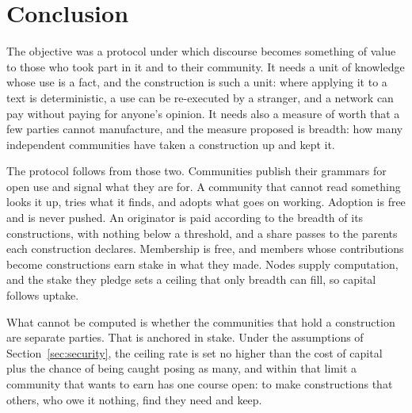 \section{Conclusion}\label{sec:conclusion}

The objective was a protocol under which discourse becomes something of value to those who took part in it and to
their community. It needs a unit of knowledge whose use is a fact, and the construction is such a unit: where
applying it to a text is deterministic, a use can be re-executed by a stranger, and a network can pay without
paying for anyone's opinion. It needs also a measure of worth that a few parties cannot manufacture, and the
measure proposed is breadth: how many independent communities have taken a construction up and kept it.

The protocol follows from those two. Communities publish their grammars for open use and signal what they are for.
A community that cannot read something looks it up, tries what it finds, and adopts what goes on working.
Adoption is free and is never pushed. An originator is paid according to the breadth of its constructions, with
nothing below a threshold, and a share passes to the parents each construction declares. Membership is free, and
members whose contributions become constructions earn stake in what they made. Nodes supply computation, and the
stake they pledge sets a ceiling that only breadth can fill, so capital follows uptake.

What cannot be computed is whether the communities that hold a construction are separate parties. That is anchored
in stake. Under the assumptions of Section~\ref{sec:security}, the ceiling rate is set no higher than the cost of
capital plus the chance of being caught posing as many, and within that limit a community that wants to earn has
one course open: to make constructions that others, who owe it nothing, find they need and keep.
